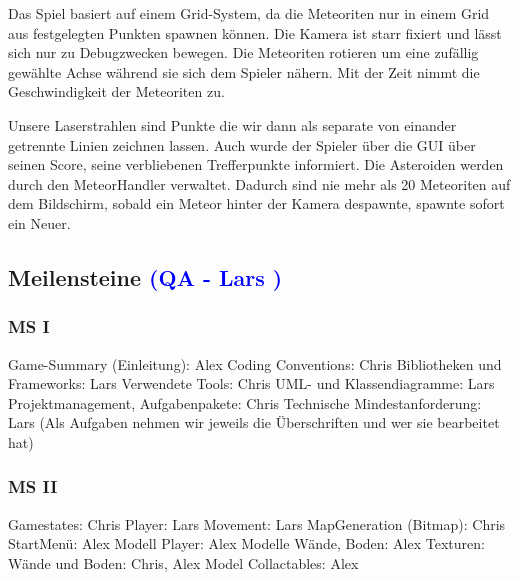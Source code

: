 \documentclass[12pt]{article}
\begin{document}
\noindent Das Spiel basiert auf einem Grid-System, da die Meteoriten nur in einem Grid aus festgelegten Punkten spawnen können. Die
Kamera ist starr fixiert und lässt sich nur zu Debugzwecken bewegen. Die Meteoriten rotieren um eine zufällig gewählte Achse während
sie sich dem Spieler nähern. Mit der Zeit nimmt die Geschwindigkeit der Meteoriten zu.\newline\newline

Unsere Laserstrahlen sind Punkte die wir dann als separate von einander getrennte Linien zeichnen lassen.
Auch wurde der Spieler über die GUI über seinen Score, seine verbliebenen Trefferpunkte informiert.
Die Asteroiden werden durch den MeteorHandler verwaltet. Dadurch sind nie mehr als 20 Meteoriten auf dem Bildschirm, sobald ein Meteor
hinter der Kamera despawnte, spawnte sofort ein Neuer.

\vspace{2cm}
\subsection{Meilensteine \textcolor{blue}{(QA - Lars )}}

\vspace{1cm}
\subsubsection{MS I}

Game-Summary (Einleitung): Alex\newline
Coding Conventions: Chris\newline
Bibliotheken und Frameworks: Lars\newline
Verwendete Tools: Chris\newline
UML- und Klassendiagramme: Lars\newline
Projektmanagement, Aufgabenpakete: Chris\newline
Technische Mindestanforderung: Lars\newline
(Als Aufgaben nehmen wir jeweils die Überschriften und wer sie bearbeitet hat)\newline
\newline

\vspace{1cm}
\subsubsection{MS II}

Gamestates: Chris\newline
Player: Lars\newline
Movement: Lars
MapGeneration (Bitmap): Chris\newline
StartMenü: Alex\newline
Modell Player: Alex\newline
Modelle Wände, Boden: Alex\newline
Texturen: Wände und Boden: Chris, Alex\newline
Model Collactables: Alex\newline
\newline
\end{document}
